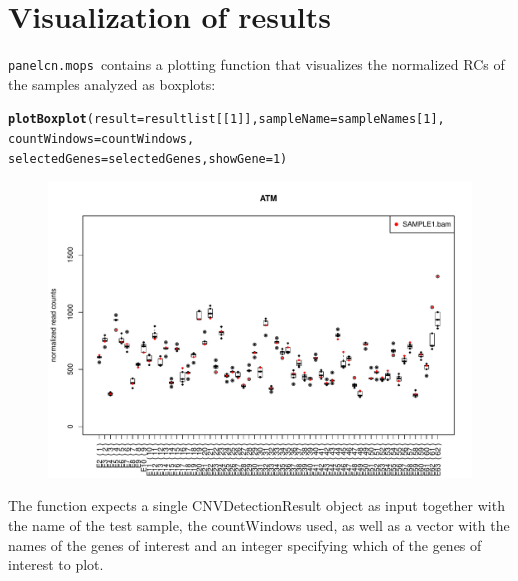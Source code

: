 \documentclass[article]{bioinf}\usepackage[]{graphicx}\usepackage[]{color}
\makeatletter
\newcommand{\hlnum}[1]{\textcolor[rgb]{0.686,0.059,0.569}{#1}}%
\newcommand{\hlstd}[1]{\textcolor[rgb]{0.345,0.345,0.345}{#1}}%
\newcommand{\hlkwc}[1]{\textcolor[rgb]{0.333,0.667,0.333}{#1}}%
\newcommand{\hlkwd}[1]{\textcolor[rgb]{0.737,0.353,0.396}{\textbf{#1}}}%
\newenvironment{kframe}{%
 \def\at@end@of@kframe{}%
 \ifinner\ifhmode%
  \def\at@end@of@kframe{\end{minipage}}%
  \begin{minipage}{\columnwidth}%
 \fi\fi%
 \def\FrameCommand##1{\hskip\@totalleftmargin \hskip-\fboxsep
 \colorbox{shadecolor}{##1}\hskip-\fboxsep
     \hskip-\linewidth \hskip-\@totalleftmargin \hskip\columnwidth}%
 \MakeFramed {\advance\hsize-\width
   \@totalleftmargin\z@ \linewidth\hsize
   \@setminipage}}%
 {\par\unskip\endMakeFramed%
 \at@end@of@kframe}
\newenvironment{knitrout}{}{} %
\newcommand{\panelcnmops}{\texttt{panelcn.mops}}
\makeatother
\begin{document}
\section{Visualization of results}
\label{s:plot}
\panelcnmops\ contains a plotting function that visualizes the normalized RCs 
of the samples analyzed as boxplots:

\begin{center}
\begin{knitrout}
\color{fgcolor}\begin{kframe}
\begin{alltt}
\hlkwd{plotBoxplot}\hlstd{(}\hlkwc{result} \hlstd{= resultlist[[}\hlnum{1}\hlstd{]],} \hlkwc{sampleName} \hlstd{= sampleNames[}\hlnum{1}\hlstd{],}
            \hlkwc{countWindows} \hlstd{= countWindows,}
            \hlkwc{selectedGenes} \hlstd{= selectedGenes,} \hlkwc{showGene} \hlstd{=} \hlnum{1}\hlstd{)}
\end{alltt}
\end{kframe}
\end{knitrout}


\begin{figure}[H]
\begin{center}
\includegraphics[angle=0,width= 0.9\columnwidth]{001.pdf}
\end{center}
\end{figure}
\end{center}

The function expects a single CNVDetectionResult object as input together with 
the name of the test sample, the countWindows used, as well as a vector with 
the names of the genes of interest and an integer specifying which of the 
genes of interest to plot.
\end{document}
